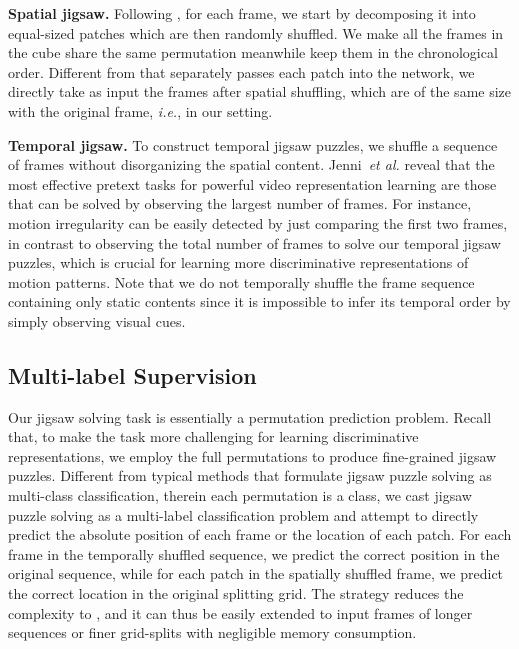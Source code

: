 \documentclass[runningheads]{llncs}
\begin{document}
\textbf{Spatial jigsaw.} Following \cite{noroozi2016unsupervised}, for each frame, we start by decomposing it into  equal-sized patches which are then randomly shuffled. We make all the frames in the cube share the same permutation meanwhile keep them in the chronological order. Different from \cite{noroozi2016unsupervised} that separately passes each patch into the network, we directly take as input the frames after spatial shuffling, which are of the same size with the original frame, \emph{i.e.},  in our setting.


\textbf{Temporal jigsaw.} To construct temporal jigsaw puzzles, we shuffle a sequence of  frames without disorganizing the spatial content. Jenni~\emph{et al.} \cite{jenni2020video} reveal that the most effective pretext tasks for powerful video representation learning are those that can be solved by observing the largest number of frames. For instance, motion irregularity \cite{georgescu2021anomaly} can be easily detected by just comparing the first two frames, in contrast to observing the total number of frames to solve our temporal jigsaw puzzles, which is crucial for learning more discriminative representations of motion patterns. Note that we do not temporally shuffle the frame sequence containing only static contents since it is impossible to infer its temporal order by simply observing visual cues.


\subsection{Multi-label Supervision}
Our jigsaw solving task is essentially a permutation prediction problem. Recall that, to make the task more challenging for learning discriminative representations, we employ the full permutations to produce fine-grained jigsaw puzzles. Different from typical methods \cite{noroozi2016unsupervised, kim2019self, lee2017unsupervised} that formulate jigsaw puzzle solving as multi-class classification, therein each permutation is a class, we cast jigsaw puzzle solving as a multi-label classification problem and attempt to directly predict the absolute position of each frame or the location of each patch. 
For each frame in the temporally shuffled sequence, we predict the correct position in the original sequence, while for each patch in the spatially shuffled frame, we predict the correct location in the original splitting grid. The strategy reduces the complexity  to , and it can thus be easily extended to input frames of longer sequences or finer grid-splits with negligible memory consumption.
\end{document}

